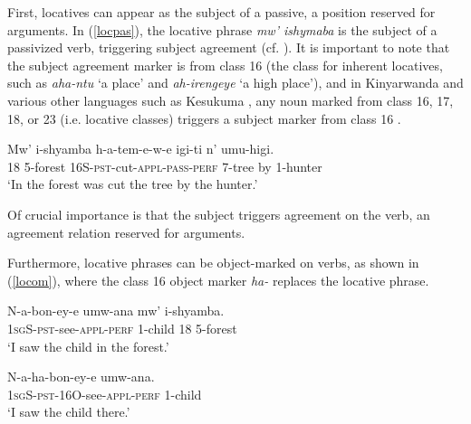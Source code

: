\documentclass[output=paper]{langsci/langscibook}
\begin{document}
 
First, locatives can appear as the subject of a passive, a position reserved for arguments. In (\ref{locpas}), the locative phrase \emph{mw' ishymaba} is the subject of a passivized verb, triggering subject agreement (cf. \citealt{bresnan:1989,bresnan:1994}). It is important to note that the subject agreement marker is from class 16 (the class for inherent locatives, such as \emph{aha-ntu} `a place' and \emph{ah-irengeye} `a high place'), and in Kinyarwanda and various other languages such as Kesukuma {\citealt[245]{batibo:1985}}, any noun marked from class 16, 17, 18, or 23 (i.e. locative classes) triggers a subject marker from class 16  \citep{maho:1999}.


\begin{exe}

	\ex\label{locpas}\gll Mw' i-shyamba h-a-tem-e-w-e igi-ti n' umu-higi.\\
			{\scshape 18} 5-forest 16S-{\scshape pst}-cut-{\scshape appl-pass-perf} 7-tree by 1-hunter\\
			\glt `In the forest was cut the tree by the hunter.'

\end{exe}
%
 Of crucial importance is that the subject triggers agreement on the verb, an agreement relation reserved for arguments.  



Furthermore, locative phrases can be object-marked on verbs, as shown in (\ref{locom}), where the class 16 object marker \emph{ha-} replaces the locative phrase. 

\begin{exe}
	\ex\begin{xlist}
	\ex\label{loco}\gll N-a-bon-ey-e umw-ana mw' i-shyamba.\\
					1{\scshape sg}S-{\scshape pst}-see-{\scshape appl-perf} 1-child 18 5-forest\\
					\glt `I saw the child in the forest.'
					
	\ex\label{locom}\gll N-a-ha-bon-ey-e umw-ana.\\
			1{\scshape sg}S-{\scshape pst-16O}-see-{\scshape appl-perf} 1-child\\
			\glt `I saw the child there.'
	\end{xlist}
\end{exe}

 
 
\end{document}
